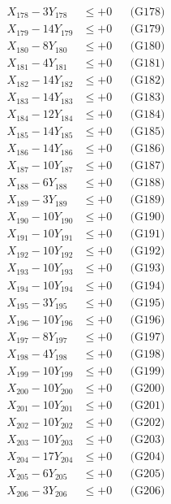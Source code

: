 \documentclass[a4paper,10pt]{article}
\begin{document}
{\begin{align}
X_{178} - 3Y_{178} &\leq +0 && \text{(G178)} \\
X_{179} - 14Y_{179} &\leq +0 && \text{(G179)} \\
X_{180} - 8Y_{180} &\leq +0 && \text{(G180)} \\
X_{181} - 4Y_{181} &\leq +0 && \text{(G181)} \\
X_{182} - 14Y_{182} &\leq +0 && \text{(G182)} \\
X_{183} - 14Y_{183} &\leq +0 && \text{(G183)} \\
X_{184} - 12Y_{184} &\leq +0 && \text{(G184)} \\
X_{185} - 14Y_{185} &\leq +0 && \text{(G185)} \\
\allowbreak
X_{186} - 14Y_{186} &\leq +0 && \text{(G186)} \\
X_{187} - 10Y_{187} &\leq +0 && \text{(G187)} \\
X_{188} - 6Y_{188} &\leq +0 && \text{(G188)} \\
X_{189} - 3Y_{189} &\leq +0 && \text{(G189)} \\
X_{190} - 10Y_{190} &\leq +0 && \text{(G190)} \\
X_{191} - 10Y_{191} &\leq +0 && \text{(G191)} \\
X_{192} - 10Y_{192} &\leq +0 && \text{(G192)} \\
X_{193} - 10Y_{193} &\leq +0 && \text{(G193)} \\
X_{194} - 10Y_{194} &\leq +0 && \text{(G194)} \\
X_{195} - 3Y_{195} &\leq +0 && \text{(G195)} \\
\allowbreak
X_{196} - 10Y_{196} &\leq +0 && \text{(G196)} \\
X_{197} - 8Y_{197} &\leq +0 && \text{(G197)} \\
X_{198} - 4Y_{198} &\leq +0 && \text{(G198)} \\
X_{199} - 10Y_{199} &\leq +0 && \text{(G199)} \\
X_{200} - 10Y_{200} &\leq +0 && \text{(G200)} \\
X_{201} - 10Y_{201} &\leq +0 && \text{(G201)} \\
X_{202} - 10Y_{202} &\leq +0 && \text{(G202)} \\
X_{203} - 10Y_{203} &\leq +0 && \text{(G203)} \\
X_{204} - 17Y_{204} &\leq +0 && \text{(G204)} \\
X_{205} - 6Y_{205} &\leq +0 && \text{(G205)} \\
\allowbreak
X_{206} - 3Y_{206} &\leq +0 && \text{(G206)} \\

\end{align}}
\end{document}
